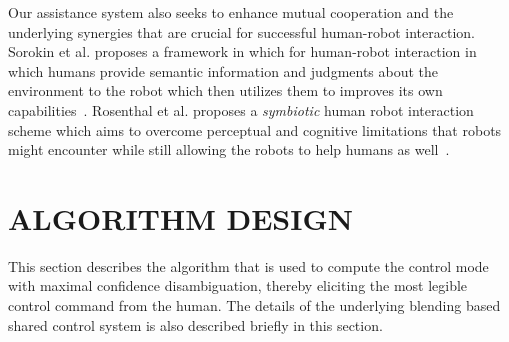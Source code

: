 \documentclass[conference]{IEEEtran}
\begin{document}
Our assistance system also seeks to enhance mutual cooperation and the underlying synergies that are crucial for successful human-robot interaction. Sorokin et al. proposes a framework in which for human-robot interaction in which humans provide semantic information and judgments about the environment to the robot which then utilizes them to improves its own capabilities~\cite{sorokin2010people}. Rosenthal et al. proposes a \textit{symbiotic} human robot interaction scheme which aims to overcome perceptual and cognitive limitations that robots might encounter while still allowing the robots to help humans as well~\cite{rosenthal2010effective}. 



%

\section{ALGORITHM DESIGN} \label{ALGO}
This section describes the algorithm that is used to compute the control mode with maximal confidence disambiguation, thereby eliciting the most legible control command from the human. The details of the underlying blending based shared control system is also described briefly in this section.
\end{document}
